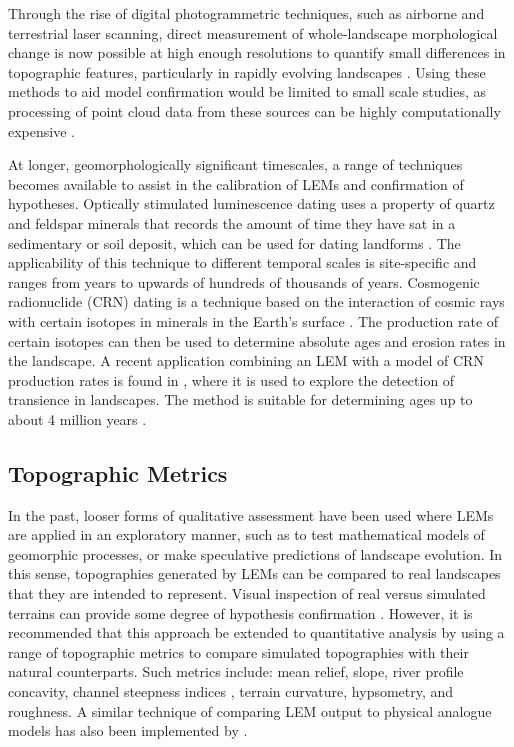 Through the rise of digital photogrammetric techniques, such as airborne and terrestrial laser scanning, direct measurement of whole-landscape morphological change is now possible at high enough resolutions to quantify small differences in topographic features, particularly in rapidly evolving landscapes \citep{rosser2005terrestrial,vaaja2011mapping}. Using these methods to aid model confirmation would be limited to small scale studies, as processing of point cloud data from these sources can be highly computationally expensive \citep{axelsson1999processing}. 

At longer, geomorphologically significant timescales, a range of techniques becomes available to assist in the calibration of LEMs and confirmation of hypotheses. Optically stimulated luminescence dating uses a property of quartz and feldspar minerals that records the amount of time they have sat in a sedimentary or soil deposit, which can be used for dating landforms \citep{aitken1998introduction,Stokes1999a,Murray2000}. The applicability of this technique to different temporal scales is site-specific and ranges from years to upwards of hundreds of thousands of years. Cosmogenic radionuclide (CRN) dating is a technique based on the interaction of cosmic rays with certain isotopes in minerals in the Earth's surface \citep{Anderson1996,dunai2010cosmogenic}. The production rate of certain isotopes can then be used to determine absolute ages and erosion rates in the landscape. A recent application combining an LEM with a model of CRN production rates is found in \citep{mudd2017detection}, where it is used to explore the detection of transience in landscapes. The method is suitable for determining ages up to about 4 million years \citep{Burbank2011}.

\subsection{Topographic Metrics}
In the past, looser forms of qualitative assessment have been used where LEMs are applied in an exploratory manner, such as to test mathematical models of geomorphic processes, or make speculative predictions of landscape evolution. In this sense, topographies generated by LEMs can be compared to real landscapes that they are intended to represent. Visual inspection of real versus simulated terrains can provide some degree of hypothesis confirmation \citep{bras2003six,hooke2003predictive}. However, it is recommended that this approach be extended to quantitative analysis by using a range of topographic metrics to compare simulated topographies with their natural counterparts. Such metrics include: mean relief, slope, river profile concavity, channel steepness indices \citep[e.g.][]{wobus2006tectonics}, terrain curvature, hypsometry, and roughness. A similar technique of comparing LEM output to physical analogue models has also been implemented by \citet{hancock2002testing}. 

